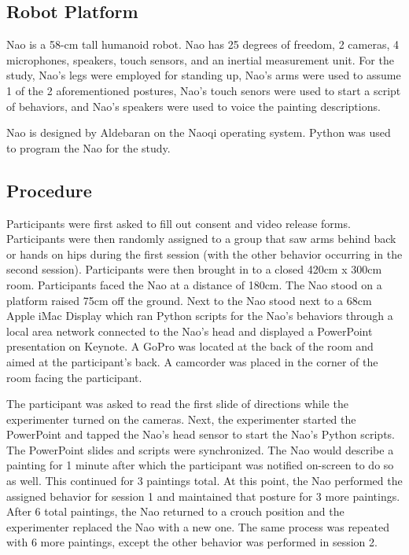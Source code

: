 \documentclass{acm_proc_article-sp}
\begin{document}
\subsection{Robot Platform}
Nao is a 58-cm tall humanoid robot. Nao has 25 degrees of freedom, 2 cameras, 4 microphones, speakers, touch sensors, and an inertial measurement unit. For the study, Nao's legs were employed for standing up, Nao's arms were used to assume 1 of the 2 aforementioned postures, Nao's touch senors were used to start a script of behaviors, and Nao's speakers were used to voice the painting descriptions. 

Nao is designed by Aldebaran on the Naoqi operating system. Python was used to program the Nao for the study. 

\subsection{Procedure}
Participants were first asked to fill out consent and video release forms. Participants were then randomly assigned to a group that saw arms behind back or hands on hips during the first session (with the other behavior occurring in the second session). Participants were then brought in to a closed 420cm x 300cm room. Participants faced the Nao at a distance of 180cm. The Nao stood on a platform raised 75cm off the ground. Next to the Nao stood next to a 68cm Apple iMac Display which ran Python scripts for the Nao's behaviors through a local area network connected to the Nao's head and displayed a PowerPoint presentation on Keynote. A GoPro was located at the back of the room and aimed at the participant's back. A camcorder was placed in the corner of the room facing the participant.

The participant was asked to read the first slide of directions while the experimenter turned on the cameras. Next, the experimenter started the PowerPoint and tapped the Nao's head sensor to start the Nao's Python scripts. The PowerPoint slides and scripts were synchronized. The Nao would describe a painting for 1 minute after which the participant was notified on-screen to do so as well. This continued for 3 paintings total. At this point, the Nao performed the assigned behavior for session 1 and maintained that posture for 3 more paintings. After 6 total paintings, the Nao returned to a crouch position and the experimenter replaced the Nao with a new one. The same process was repeated with 6 more paintings, except the other behavior was performed in session 2. 
\end{document}
